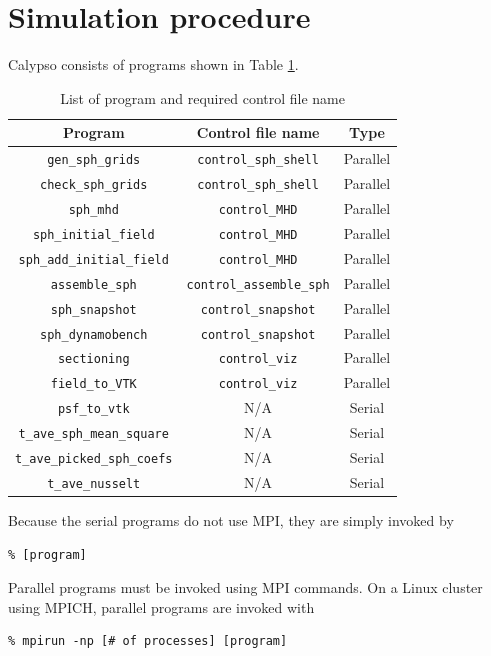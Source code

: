 \section{Simulation procedure}
Calypso consists of programs shown in Table \ref{table:controls}.
%
\begin{table}[htp]
\caption{List of program and required control file name}
\begin{center}
\begin{tabular}{|c|c|c|}
\hline
Program & Control file name & Type \\ \hline
\verb|gen_sph_grids|          & \verb|control_sph_shell| &  Parallel    \\
\verb|check_sph_grids|        & \verb|control_sph_shell| &  Parallel    \\ \hline
\verb|sph_mhd|                & \verb|control_MHD| &        Parallel  \\ \hline
\verb|sph_initial_field|      & \verb|control_MHD| &        Parallel  \\
\verb|sph_add_initial_field|  & \verb|control_MHD| &        Parallel  \\
\verb|assemble_sph|           & \verb|control_assemble_sph| & Parallel  \\ \hline
\verb|sph_snapshot|           & \verb|control_snapshot| &   Parallel  \\
\verb|sph_dynamobench|        & \verb|control_snapshot| &   Parallel  \\ \hline
\verb|sectioning|             & \verb|control_viz| &        Parallel  \\
\verb|field_to_VTK|           & \verb|control_viz| &        Parallel  \\
\verb|psf_to_vtk|             & N/A & Serial  \\ \hline
\verb|t_ave_sph_mean_square|  & N/A & Serial  \\
\verb|t_ave_picked_sph_coefs| & N/A & Serial  \\
\verb|t_ave_nusselt|          & N/A & Serial  \\ \hline
\end{tabular}
\end{center}
\label{table:controls}
\end{table}
%

Because the serial programs do not use MPI, they are simply invoked by
%
\begin{verbatim}
% [program]
\end{verbatim}
%
Parallel programs must be invoked using MPI commands. On a Linux cluster using MPICH, parallel programs are invoked with 
%
\begin{verbatim}
% mpirun -np [# of processes] [program]
\end{verbatim}
%

